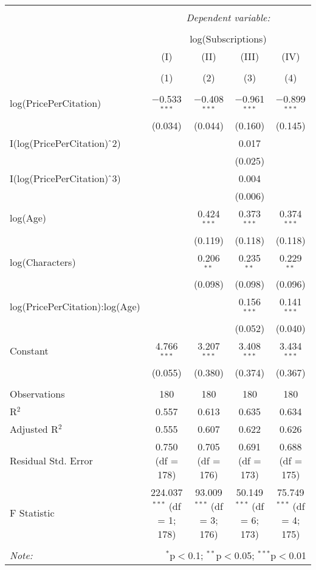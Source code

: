 \documentclass[
]{article}
\begin{document}
\begin{table}[!htbp] \centering 
  \caption{} 
  \label{} 
\small 
\begin{tabular}{@{\extracolsep{1pt}}lcccc} 
\\[-1.8ex]\hline 
\hline \\[-1.8ex] 
 & \multicolumn{4}{c}{\textit{Dependent variable:}} \\ 
\cline{2-5} 
\\[-1.8ex] & \multicolumn{4}{c}{log(Subscriptions)} \\ 
 & (I) & (II) & (III) & (IV) \\ 
\\[-1.8ex] & (1) & (2) & (3) & (4)\\ 
\hline \\[-1.8ex] 
 log(PricePerCitation) & $-$0.533$^{***}$ & $-$0.408$^{***}$ & $-$0.961$^{***}$ & $-$0.899$^{***}$ \\ 
  & (0.034) & (0.044) & (0.160) & (0.145) \\ 
  I(log(PricePerCitation)$\hat{\mkern6mu}$2) &  &  & 0.017 &  \\ 
  &  &  & (0.025) &  \\ 
  I(log(PricePerCitation)$\hat{\mkern6mu}$3) &  &  & 0.004 &  \\ 
  &  &  & (0.006) &  \\ 
  log(Age) &  & 0.424$^{***}$ & 0.373$^{***}$ & 0.374$^{***}$ \\ 
  &  & (0.119) & (0.118) & (0.118) \\ 
  log(Characters) &  & 0.206$^{**}$ & 0.235$^{**}$ & 0.229$^{**}$ \\ 
  &  & (0.098) & (0.098) & (0.096) \\ 
  log(PricePerCitation):log(Age) &  &  & 0.156$^{***}$ & 0.141$^{***}$ \\ 
  &  &  & (0.052) & (0.040) \\ 
  Constant & 4.766$^{***}$ & 3.207$^{***}$ & 3.408$^{***}$ & 3.434$^{***}$ \\ 
  & (0.055) & (0.380) & (0.374) & (0.367) \\ 
 \hline \\[-1.8ex] 
Observations & 180 & 180 & 180 & 180 \\ 
R$^{2}$ & 0.557 & 0.613 & 0.635 & 0.634 \\ 
Adjusted R$^{2}$ & 0.555 & 0.607 & 0.622 & 0.626 \\ 
Residual Std. Error & 0.750 (df = 178) & 0.705 (df = 176) & 0.691 (df = 173) & 0.688 (df = 175) \\ 
F Statistic & 224.037$^{***}$ (df = 1; 178) & 93.009$^{***}$ (df = 3; 176) & 50.149$^{***}$ (df = 6; 173) & 75.749$^{***}$ (df = 4; 175) \\ 
\hline 
\hline \\[-1.8ex] 
\textit{Note:}  & \multicolumn{4}{r}{$^{*}$p$<$0.1; $^{**}$p$<$0.05; $^{***}$p$<$0.01} \\ 
\end{tabular} 
\end{table}
\end{document}
